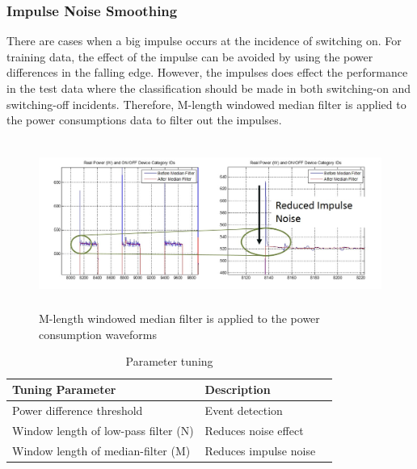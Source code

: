 \documentclass[11pt, letterpaper]{article}
\begin{document}
\subsubsection{Impulse Noise Smoothing}
There are cases when a big impulse occurs at the incidence of switching on.  For training data, the effect of the impulse can be avoided by using the power differences in the falling edge. However, the impulses does effect the performance in the test data where the classification should be made in both switching-on and switching-off incidents.  Therefore, M-length windowed median filter is applied to the power consumptions data to filter out the impulses.
\begin{figure}[h]
\centering  
\includegraphics[height=5.5cm]{fig/med.jpg}
\caption{M-length windowed median filter is applied to the power consumption waveforms}
\label{fig:med}
\end{figure}

\begin{table}[h]
\caption{Parameter tuning}
\begin{center}
\begin{tabular}{|l|l|l|}\hline
\textbf{Tuning Parameter} & \textbf{Description}\\
\hline
Power difference threshold & Event detection\\
\hline
Window length of low-pass filter (N) & Reduces noise effect\\
\hline
Window length of median-filter (M) & Reduces impulse noise\\
\hline
\end{tabular}
\end{center}
\end{table}
\end{document}
